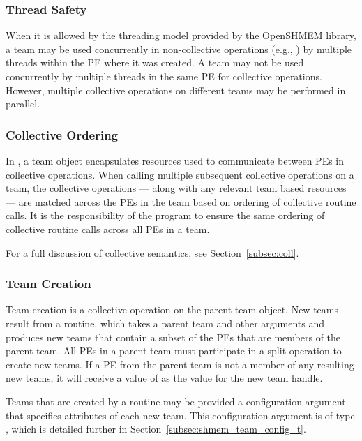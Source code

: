\subsubsection*{Thread Safety}

When it is allowed by the threading model provided by the OpenSHMEM
library, a team may be used concurrently in non-collective operations
(e.g., ) by multiple threads within the
\ac{PE} where it was created.
A team may not be used concurrently by multiple threads in the same \ac{PE} for
collective operations. However, multiple collective operations on different
teams may be performed in parallel.

\subsubsection*{Collective Ordering}

In \openshmem, a team object encapsulates resources used to communicate
between \acp{PE} in collective operations. When calling multiple subsequent
collective operations on a team, the collective operations --- along with any
relevant team based resources --- are matched across the \acp{PE} in the team
based on ordering of collective routine calls. It is the responsibility
of the \openshmem program to ensure the same ordering of collective routine calls
across all \acp{PE} in a team.

For a full discussion of collective semantics, see Section~\ref{subsec:coll}.

\subsubsection*{Team Creation}

Team creation is a collective operation on the parent team object. New teams
result from a  routine, which takes a parent team
and other arguments and produces new teams that contain a subset of the \acp{PE}
that are members of the parent
team. All \acp{PE} in a parent team must participate in a split operation
to create new teams. If a \ac{PE} from the parent team is not a member of any
resulting new teams, it will receive a value of 
as the value for the new team handle.

Teams that are created by a  routine may be
provided a configuration argument that specifies attributes of each new team.
This configuration argument is of type , which
is detailed further in Section~\ref{subsec:shmem_team_config_t}.

